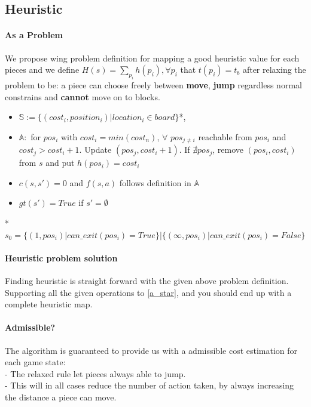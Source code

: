 \documentclass[10.5pt,a4paper]{article}
\begin{document}
    \subsection{Heuristic}
        \paragraph{As a Problem} We propose wing problem definition for mapping a good heuristic value for each pieces and we define $H(s) = \sum_{p_i}h(p_i), \forall p_i$ that $t(p_i) = t_b$ after relaxing the problem to be: a piece can choose freely between \textbf{move}, \textbf{jump} regardless normal constrains and \textbf{cannot} move on to blocks.
        \begin{itemize}
            \itemsep0em   
            \item $\mathbb{S} := \{(cost_i, position_i)|location_i\in board\}$*,
            \item $\mathbb{A} :$ for $pos_i$ with $cost_i=min({cost_n})$, $\forall$ $pos_{j\ne i} $ reachable from $pos_i$ and $cost_j > cost_i+1$. Update $(pos_j, cost_i + 1)$. If $\nexists pos_j$, remove $(pos_i, cost_i)$ from $s$ and put $h(pos_i) = cost_i$
            \item $c(s, s')=0$ and $f(s,a)$ follows definition in $\mathbb{A}$
            \item $gt(s')=True$ if $s' = \emptyset$
        \end{itemize}
        \vspace{-5pt}
        *$s_0 = \{(1, pos_i)|can\_exit(pos_i) = True\} | \{(\infty, pos_i)|can\_exit(pos_i) = False\}$
        \vspace{-10pt}
        \paragraph{Heuristic problem solution} Finding heuristic is straight forward with the given above problem definition. Supporting all the given operations to \ref{a_star}, and you should end up with a complete heuristic map.
        \vspace{-10pt}
        \paragraph{Admissible?} The algorithm is guaranteed to provide us with a admissible cost estimation for each game state:\\
    - The relaxed rule let pieces always able to jump.\\
    - This will in all cases reduce the number of action taken, by always increasing the distance a piece can move.
    \vspace{-10pt}
\end{document}
